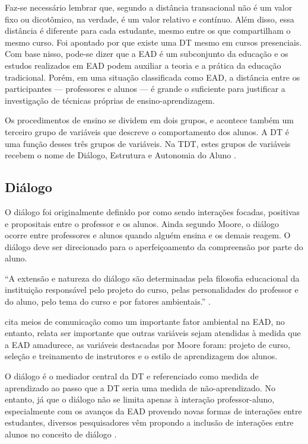 Faz-se necessário lembrar que, segundo 
a distância transacional não é um valor fixo ou dicotômico, na verdade, é um
valor relativo e contínuo. Além disso, essa distância é diferente para cada
estudante, mesmo entre os que compartilham o mesmo curso. Foi apontado por
 que existe uma DT mesmo em cursos presenciais.
Com base nisso, pode-se dizer que a EAD é um subconjunto da educação e os
estudos realizados em EAD podem auxiliar a teoria e a prática da educação
tradicional. Porém, em uma situação classificada como EAD, a distância entre os
participantes --- professores e alunos --- é grande o suficiente para justificar
a investigação de técnicas próprias de ensino-aprendizagem.

Os procedimentos de ensino se dividem em dois grupos, e acontece também um
terceiro grupo de variáveis que descreve o comportamento dos alunos. A DT é uma
função desses três grupos de variáveis. Na TDT, estes grupos de variáveis
recebem o nome de Diálogo, Estrutura e Autonomia do Aluno
\citeauthor{moore1973transational}.

\subsection{Diálogo}

O diálogo foi originalmente definido por
 como sendo interações focadas,
positivas e propositais entre o professor e os alunos. Ainda segundo Moore, o
diálogo ocorre entre professores e alunos quando alguém ensina e os demais
reagem. O diálogo deve ser direcionado para o aperfeiçoamento da compreensão por
parte do aluno.

``A extensão e natureza do diálogo são determinadas pela filosofia educacional
da instituição responsável pelo projeto do curso, pelas personalidades do
professor e do aluno, pelo tema do curso e por fatores ambientais.''
\cite[p.~438]{cabau2018teoria}.

 cita meios de comunicação como um
importante fator ambiental na EAD, no entanto, relata ser importante que outras
variáveis sejam atendidas à medida que a EAD amadurece, as variáveis destacadas
por Moore foram: projeto de curso, seleção e treinamento de instrutores e o
estilo de aprendizagem dos alunos.

O diálogo é o mediador central da DT e referenciado como medida de aprendizado
ao passo que a DT seria uma medida de não-aprendizado. No entanto, já que o
diálogo não se limita apenas à interação professor-aluno, especialmente com os
avanços da EAD provendo novas formas de interações entre estudantes, diversos
pesquisadores vêm propondo a inclusão de interações entre alunos no conceito de
diálogo \cite{benson2009addressing,chen1999dimensions,huang2016understanding}.

